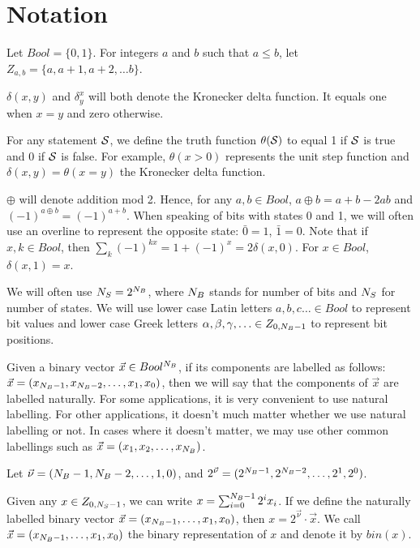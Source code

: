 
\chapter{Notation}


Let $Bool = \{0,1\}$.
For integers $a$ and $b$ such that $a\leq b$,
let $Z_{a,b} = \{a, a+1, a+2, \ldots b\}$.


$\delta(x, y)$ and $\delta^x_y$ will both
denote the Kronecker delta function.
It equals one when $x=y$ and zero otherwise.

For any statement ${\cal S}$,
we define the truth function $\theta({\cal S})$
to equal 1 if ${\cal S}$ is true
and 0 if ${\cal S}$ is false.
For example, $\theta(x>0)$ represents the unit step
function and $\delta(x, y)=\theta(x=y)$
the Kronecker delta function.


$\oplus$ will denote
addition mod 2.
Hence, for any $a,b\in Bool$,
$a\oplus b = a + b - 2ab$ and
$(-1)^{a\oplus b} = (-1)^{a+b}$.
When speaking of bits with states
0 and 1, we will often use
an overline to represent
the opposite state:
$\bar{0} = 1$, $\bar{1} = 0$.
Note that if $x, k\in Bool$, then
$\sum_k (-1)^{kx} = 1 + (-1)^x = 2 \delta(x, 0)$.
For $x\in Bool$, $\delta(x,1)=x$.

We will often use ${N_S}=2^{N_B}$,
where ${N_B}$ stands for number of bits and
${N_S}$ for number of states.
We will use lower case Latin letters
$a,b,c\ldots \in Bool$ to
represent bit values and
lower case Greek letters
$\alpha, \beta, \gamma, \ldots \in Z_{0, {N_B}-1} $
to represent bit positions.

Given a binary vector
$\vec{x}\in Bool^{N_B}$,
if its components are
labelled as follows:
$\vec{x} =
(x_{{N_B}-1}, x_{{N_B}-2}, \ldots, x_1, x_0)$,
then
we will say that the components of
$\vec{x}$ are labelled naturally.
For some applications, it is very convenient
to use natural labelling. For other applications,
it doesn't much matter whether we use
natural labelling or not.
In cases where it doesn't matter, we may
use other common labellings such as
$\vec{x} =
(x_1, x_2, \ldots, x_{N_B})$.

Let
$\vec{\nu}=
({N_B}-1, {N_B}-2, \ldots, 1,0)$, and
$2^{\vec{\nu}}=(2^{{N_B}-1}, 2^{{N_B}-2}, \ldots, 2^1,2^0)$.

Given any $x\in Z_{0, {N_S}-1}$, we can write
$x=\sum_{i=0}^{{N_B}-1}2^i x_i$.
If we define the naturally labelled
binary vector $\vec{x} =
(x_{{N_B}-1}, \ldots, x_1, x_0)$,
then $x=2^{\vec{\nu}}\cdot \vec{x}$.
We call $\vec{x} =
(x_{{N_B}-1}, \ldots, x_1, x_0)$
 the binary representation
of $x$ and denote it by $bin(x)$.

